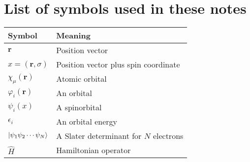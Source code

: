 \documentclass[../Main/notes.tex]{subfiles}
\begin{document}
\section*{List of symbols used in these notes}
\begin{center}
\begin{tabular}{@{} ll @{}} %
\toprule
Symbol & Meaning \\
\midrule
$\mathbf{r}$ & Position vector \\
$x = (\mathbf{r}, \sigma)$ & Position vector plus spin coordinate \\
$\chi_\mu(\mathbf{r})$ & Atomic orbital \\
$\varphi_i(\mathbf{r})$ & An orbital \\
$\psi_i(x)$ & A spinorbital \\
$\epsilon_i$ & An orbital energy \\
$\ket{\psi_1 \psi_2 \cdots \psi_N}$ & A Slater determinant for $N$ electrons \\
$\hat{H}$ & Hamiltonian operator \\
\bottomrule
\end{tabular}
\end{center}
\end{document}
